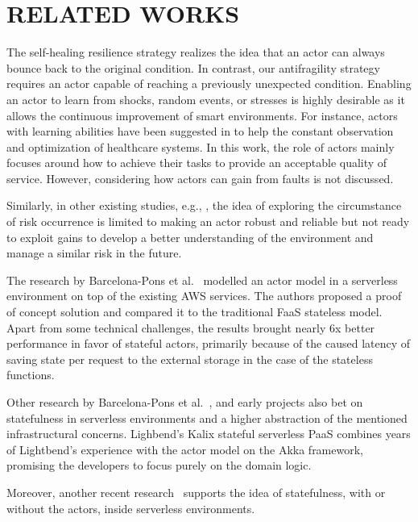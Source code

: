 \documentclass[conference]{IEEEtran}
\begin{document}
\section{\uppercase{Related Works}}
\label{sec:rel-works}

The self-healing resilience strategy realizes the idea that an actor can always bounce back to the original condition. In contrast, our antifragility strategy requires an actor capable of reaching a previously unexpected condition. Enabling an actor to learn from shocks, random events, or stresses is highly desirable as it allows the continuous improvement of smart environments. For instance, actors with learning abilities have been suggested in \cite{cao2021intelligent} to help the constant observation and optimization of healthcare systems. In this work, the role of actors mainly focuses around how to achieve their tasks to provide an acceptable quality of service. However, considering how actors can gain from faults is not discussed. 


Similarly, in other existing studies, e.g., \cite{daniel2018serverless,barcelona-pons_faas_2019}, the idea of exploring the circumstance of risk occurrence is limited to making an actor robust and reliable but not ready to exploit gains to develop a better understanding of the environment and manage a similar risk in the future.

The research by Barcelona-Pons et al.~\cite{daniel2018serverless} modelled an actor model in a serverless environment on top of the existing AWS services. 
The authors proposed a proof of concept solution and compared it to the traditional FaaS stateless model. Apart from some technical challenges, the results brought nearly 6x better performance in favor of stateful actors, primarily because of the caused latency of saving state per request to the external storage in the case of the stateless functions.

Other research by Barcelona-Pons et al.~\cite{barcelona-pons_faas_2019}, and early projects also bet on statefulness in serverless environments and a higher abstraction of the mentioned infrastructural concerns. Lighbend's Kalix stateful serverless PaaS combines years of Lightbend's experience with the actor model on the Akka framework, promising the developers to focus purely on the domain logic. 

Moreover, another recent research~\cite{barcelona-pons_faas_2019,sreekanti_cloudburst_2020} supports the idea of statefulness, with or without the actors, inside serverless environments.
\end{document}
